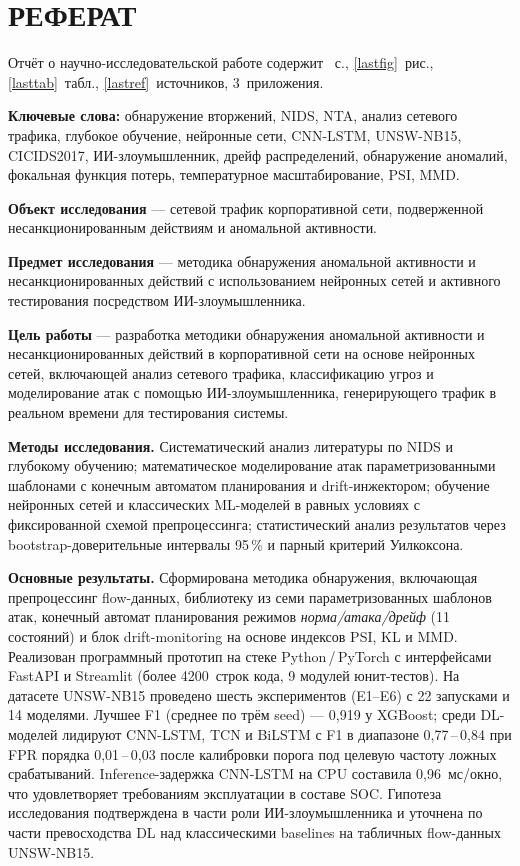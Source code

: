 \section*{РЕФЕРАТ}

Отчёт о научно-исследовательской работе содержит \pageref{LastPage}~с.,
\ref{lastfig}~рис., \ref{lasttab}~табл., \ref{lastref}~источников,
3~приложения.

\textbf{Ключевые слова:} обнаружение вторжений, NIDS, NTA, анализ
сетевого трафика, глубокое обучение, нейронные сети, CNN-LSTM,
UNSW-NB15, CICIDS2017, ИИ-злоумышленник, дрейф распределений, обнаружение
аномалий, фокальная функция потерь, температурное масштабирование, PSI, MMD.

\textbf{Объект исследования} --- сетевой трафик корпоративной сети,
подверженной несанкционированным действиям и аномальной активности.

\textbf{Предмет исследования} --- методика обнаружения аномальной
активности и несанкционированных действий с использованием нейронных
сетей и активного тестирования посредством ИИ-злоумышленника.

\textbf{Цель работы} --- разработка методики обнаружения аномальной
активности и несанкционированных действий в корпоративной сети на
основе нейронных сетей, включающей анализ сетевого трафика,
классификацию угроз и моделирование атак с помощью ИИ-злоумышленника,
генерирующего трафик в реальном времени для тестирования системы.

\textbf{Методы исследования.} Систематический анализ литературы по
NIDS и глубокому обучению; математическое моделирование атак
параметризованными шаблонами с конечным автоматом планирования и
drift-инжектором; обучение нейронных сетей и классических ML-моделей
в равных условиях с фиксированной схемой препроцессинга;
статистический анализ результатов через bootstrap-доверительные
интервалы 95\,\% и парный критерий Уилкоксона.

\textbf{Основные результаты.} Сформирована методика обнаружения,
включающая препроцессинг flow-данных, библиотеку из семи
параметризованных шаблонов атак, конечный автомат планирования режимов
\emph{норма/атака/дрейф} (11 состояний) и блок drift-monitoring на
основе индексов PSI, KL и MMD. Реализован программный прототип на
стеке Python\,/\,PyTorch с интерфейсами FastAPI и Streamlit (более
4200~строк кода, 9 модулей юнит-тестов). На датасете UNSW-NB15
проведено шесть экспериментов (E1--E6) с 22 запусками и 14 моделями.
Лучшее F1 (среднее по трём seed) --- 0{,}919 у XGBoost; среди
DL-моделей лидируют CNN-LSTM, TCN и BiLSTM с F1 в диапазоне
0{,}77\,--\,0{,}84 при FPR порядка 0{,}01\,--\,0{,}03 после
калибровки порога под целевую частоту ложных срабатываний.
Inference-задержка CNN-LSTM на CPU составила 0{,}96~мс/окно, что
удовлетворяет требованиям эксплуатации в составе SOC. Гипотеза
исследования подтверждена в части роли ИИ-злоумышленника и уточнена
по части превосходства DL над классическими baselines на табличных
flow-данных UNSW-NB15.

